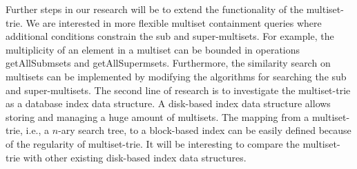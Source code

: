 \documentclass[10pt,letterpaper]{article}
\begin{document}
%
Further steps in our research will be to extend the functionality of the multiset-trie. We are interested in more flexible multiset containment queries where additional conditions constrain the sub and super-multisets. For example, the multiplicity of an element in a multiset can be bounded in operations getAllSubmsets and getAllSupermsets. Furthermore, the similarity search on multisets can be implemented by modifying the algorithms for searching the sub and super-multisets. 
%
The second line of research is to investigate the multiset-trie as a database index data structure. A disk-based index data structure allows storing and managing a huge amount of multisets. The mapping from a multiset-trie, i.e., a $n$-ary search tree, to a block-based index can be easily defined because of the regularity of multiset-trie. It will be interesting to compare the multiset-trie with other existing disk-based index data structures.



\nolinenumbers
\end{document}
